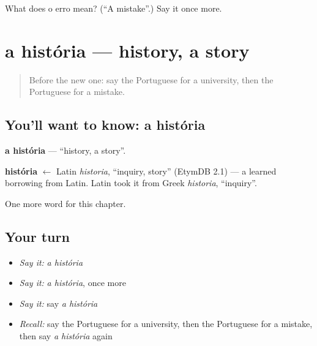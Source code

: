\begin{tcolorbox}[breakable,colback=teal!4,colframe=teal!35!black,title={Before you move on}]
What does o erro mean? (\textquotedblleft{}A mistake\textquotedblright{}.) Say it once more.
\end{tcolorbox}
\section[a história]{a história — history, a story}

\label{lesson:PT-C230-historia}



\begin{quote}
Before the new one: say the Portuguese for a university, then the Portuguese for a mistake.
\end{quote}

\subsection*{You'll want to know: a história}
\textbf{a história} — \textquotedblleft{}history, a story\textquotedblright{}.

\begin{cousinweb}
\textbf{história} $\leftarrow$ Latin \emph{historia}, \textquotedblleft{}inquiry, story\textquotedblright{} (EtymDB 2.1) — a learned borrowing from Latin. Latin took it from Greek \emph{historia}, \textquotedblleft{}inquiry\textquotedblright{}.
\end{cousinweb}

\begin{grammarlens}[title={What you've built}]
One more word for this chapter.
\end{grammarlens}

\subsection*{Your turn}
\begin{itemize}
\raggedright
  \item \emph{Say it:} \emph{a história}
  \item \emph{Say it:} \emph{a história}, once more
  \item \emph{Say it:} say \emph{a história}
  \item \emph{Recall:} say the Portuguese for a university, then the Portuguese for a mistake, then say \emph{a história} again
\end{itemize}

